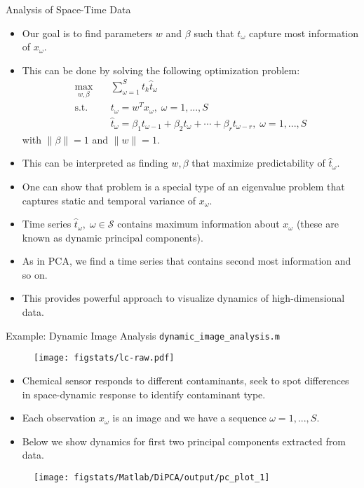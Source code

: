 \documentclass[9pt]{beamer}
\begin{document}
%
\begin{frame}{Analysis of Space-Time Data}

\begin{itemize}
\setlength{\itemsep}{5pt}
\item Our goal is to find parameters $w$ and $\beta$ such that $t_\omega$ capture most information of $x_\omega$.
\item This can be done by solving the following optimization problem:
\begin{align*}
\max_{w,\beta}& \quad \sum_{\omega=1}^{S}t_k\hat{t}_\omega\\
\textrm{s.t.}& \quad t_\omega=w^Tx_\omega,\; \omega=1,...,S\\
& \quad \hat{t}_\omega=\beta_1t_{\omega-1}+\beta_2t_{\omega}+\cdots+\beta_rt_{\omega-r},\; \omega=1,...,S
\end{align*}
with $\|\beta\|=1$ and $\|w\|=1$. 
\item This can be interpreted as finding $w,\beta$ that maximize predictability of $\hat{t}_\omega$. 
\item One can show that problem is a special type of an eigenvalue problem that captures static and temporal variance of $x_\omega$. 
\item Time series $\hat{t}_\omega,\; \omega\in\mathcal{S}$ contains maximum information about $x_\omega$ (these are known as dynamic principal components).
\item As in PCA, we find a time series that contains second most information and so on.
\item This provides powerful approach to visualize dynamics of high-dimensional data. 
\end{itemize}

\end{frame}

\begin{frame}{Example: Dynamic Image Analysis \footnotesize{\texttt{dynamic\_image\_analysis.m}}}
\begin{figure}[!htb]
    \centering
  \texttt{[image: figstats/lc-raw.pdf]}
  \end{figure}
  \vspace{-0.1in}
  \begin{itemize}
  \setlength{\itemsep}{5pt}
  \item Chemical sensor responds to different contaminants, seek to spot differences in space-dynamic response to identify contaminant type.
  \item Each observation $x_\omega$ is an image and we have a sequence $\omega=1,...,S$.
  \item Below we show dynamics for first two principal components extracted from data.
  \end{itemize}
\begin{figure}[!htb]
    \centering
    \texttt{[image: figstats/Matlab/DiPCA/output/pc\_plot\_1]}
    \end{figure}
\end{frame}
\end{document}
